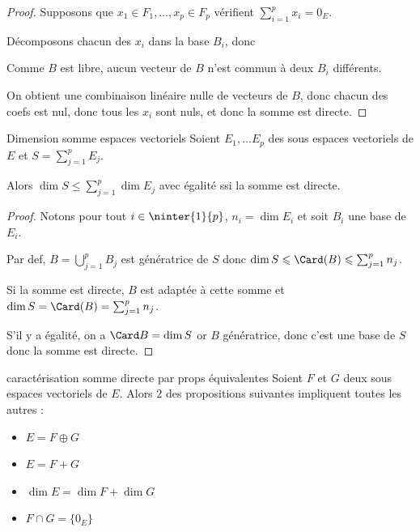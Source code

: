 \begin{proof}
    Supposons que $x_1 \in F_1, \dots, x_p \in F_p$ vérifient $\sum_{i = 1 }^{ p } x_i = 0_E$.

    Décomposons chacun des $x_i$ dans la base $B_i$, donc

    Comme $B$ est libre, aucun vecteur de $B$ n'est commun à deux $B_i$ différents. 

    On obtient une combinaison linéaire nulle de vecteurs de $B$, donc chacun des coefs est nul, 
    donc tous les $x_i$ sont nuls, et donc la somme est directe. 
\end{proof}

\begin{proposition}{Dimension somme espaces vectoriels}{}
    Soient $E_1, \dots E_p$ des sous espaces vectoriels de $E$ et $\displaystyle S = \sum_{j=1}^p E_j$.

    Alors $\displaystyle \dim S \leqslant \sum_{j=1}^p \dim E_j$ avec égalité ssi la 
    somme est directe.
\end{proposition}

\begin{proof}
    Notons pour tout $i \in \ninter{1}{p}$, $n_i = \dim E_i$ et soit $B_i$ une base de $E_i$.

    Par def, $B = \bigcup_{j=1}^p B_j$ est génératrice de $S$ donc $\dim S \leqslant \Card(B) \leqslant \sum_{j=1}^p n_j$.

    Si la somme est directe, $B$ est adaptée à cette somme et $\dim S = \Card(B) = \sum_{j=1}^p n_j$.

    S'il y a égalité, on a $\Card B = \dim S$ or $B$ génératrice, donc 
    c'est une base de $S$ donc la somme est directe.
\end{proof}

\begin{propositionnt}{caractérisation somme directe par props équivalentes}{}
    Soient $F$ et $G$ deux sous espaces vectoriels de $E$. Alors $2$ des propositions 
    suivantes impliquent toutes les autres : 
    \begin{itemize}
        \item $E = F \oplus G$
        \item $E = F + G$
        \item $\dim E = \dim F + \dim G$
        \item $F \cap G = \{0_E\}$
    \end{itemize}
\end{propositionnt}

